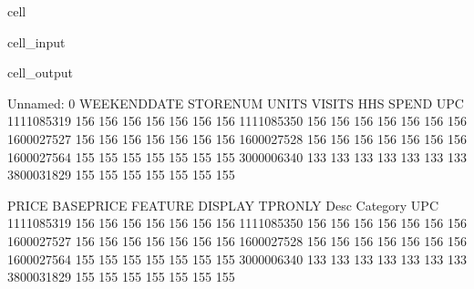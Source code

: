 \documentclass[letterpaper,10pt,english]{jupyterBook}
\begin{document}
\begin{sphinxuseclass}{cell}\begin{sphinxVerbatimInput}

\begin{sphinxuseclass}{cell_input}
\begin{sphinxVerbatim}[commandchars=\\\{\}]
\end{sphinxVerbatim}

\end{sphinxuseclass}\end{sphinxVerbatimInput}
\begin{sphinxVerbatimOutput}

\begin{sphinxuseclass}{cell_output}
\begin{sphinxVerbatim}[commandchars=\\\{\}]
            Unnamed: 0  WEEK\PYGZus{}END\PYGZus{}DATE  STORE\PYGZus{}NUM  UNITS  VISITS  HHS  SPEND  \PYGZbs{}
UPC                                                                           
1111085319         156            156        156    156     156  156    156   
1111085350         156            156        156    156     156  156    156   
1600027527         156            156        156    156     156  156    156   
1600027528         156            156        156    156     156  156    156   
1600027564         155            155        155    155     155  155    155   
3000006340         133            133        133    133     133  133    133   
3800031829         155            155        155    155     155  155    155   

            PRICE  BASE\PYGZus{}PRICE  FEATURE  DISPLAY  TPR\PYGZus{}ONLY  Desc  Category  \PYGZbs{}
UPC                                                                         
1111085319    156         156      156      156       156   156       156   
1111085350    156         156      156      156       156   156       156   
1600027527    156         156      156      156       156   156       156   
1600027528    156         156      156      156       156   156       156   
1600027564    155         155      155      155       155   155       155   
3000006340    133         133      133      133       133   133       133   
3800031829    155         155      155      155       155   155       155   


\end{sphinxVerbatim}
\end{sphinxuseclass}
\end{sphinxVerbatimOutput}
\end{sphinxuseclass}
\end{document}
